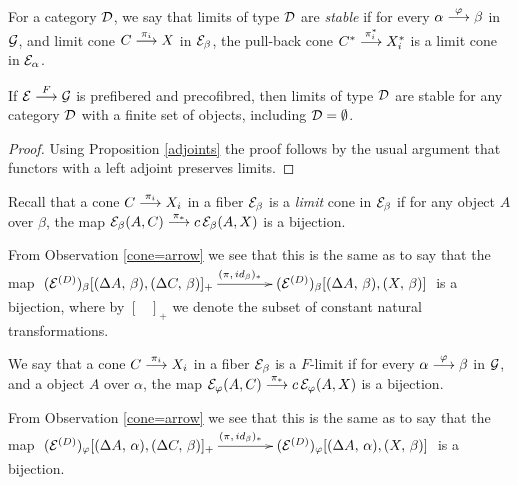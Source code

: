 %
\begin{definition} 
For a category $\mathcal{D}$, we say that limits of type $\mathcal{D}$ are
\emph{stable} if for every $\alpha \overset {\varphi} {\longrightarrow} \beta$ in $\mathcal{G}$,  and limit cone  
$C \overset {\pi_i} {\longrightarrow} X$ in $\mathcal{E}_\beta$, the pull-back cone  
$C^* \overset {\pi^*_i} {\longrightarrow} X^*_i$ is a limit cone in $\mathcal{E}_\alpha$.
\end{definition}
%
\begin{proposition}\label{prefi mas precofib preserva limites}
If $\mathcal{E} \overset {F} {\longrightarrow} \mathcal{G}$ is prefibered and precofibred, then limits of type $\mathcal{D}$ are stable for any category $\mathcal{D}$ with a finite set of objects, including $\mathcal{D} = \emptyset$.
\end{proposition}
\begin{proof}
Using Proposition \ref{adjoints} the proof follows by the usual argument that functors with a left adjoint preserves limits.   
\end{proof} 
\begin{nobservation} \label{lcone=larrow}
Recall that a cone  
\mbox{$C \overset {\pi_i} {\longrightarrow} X_i$} in a fiber $\mathcal{E}_\beta$ is a 
\emph{limit} cone in $\mathcal{E}_\beta$ if for any object $A$ over $\beta$, the map 
$\mathcal{E}_\beta(A,C) \overset {\pi_*} {\longrightarrow} c \,\mathcal{E}_\beta(A,X)$ is a bijection.

\vspace{1ex}

From Observation \ref{cone=arrow} we see that this is the same as to say that the map  
$\xymatrix@C=9ex
   {
    (\cc{E}^{(D)})_\beta[(\Delta A,\,\beta), (\Delta C,\,\beta)]_{+} 
    \ar[r]^{(\pi,\, id_\beta)_*}
  & %
  (\cc{E}^{(D)})_\beta[(\Delta A,\,\beta), (X,\,\beta)]
    }
$
is a bijection, where by  $[\;\;\;]_{+}$ we denote the subset of constant natural transformations. \cqd
\end{nobservation}
\begin{definition} \label{prepreserves}
We say that a cone  $C \overset {\pi_i} {\longrightarrow} X_i$ in a fiber $\mathcal{E}_\beta$ is a $F$-limit if for every $\alpha \overset {\varphi} {\longrightarrow} \beta$ in 
$\mathcal{G}$, and a object $A$ over $\alpha$, the map 
$\mathcal{E}_\varphi(A,C) \overset {\pi_*} {\longrightarrow} c \,\mathcal{E}_\varphi(A,X)$ is a bijection.

\vspace{1ex}

From Observation \ref{cone=arrow} we see that this is the same as to say that the map  
$\xymatrix@C=9ex
   {
    (\cc{E}^{(D)})_\varphi[(\Delta A,\,\alpha), (\Delta C,\,\beta)]_{+} 
    \ar[r]^{(\pi,\, id_\beta)_*}
   & (\cc{E}^{(D)})_\varphi[(\Delta A,\,\alpha), (X,\,\beta)]
    }
$
is a bijection.   
\end{definition}

